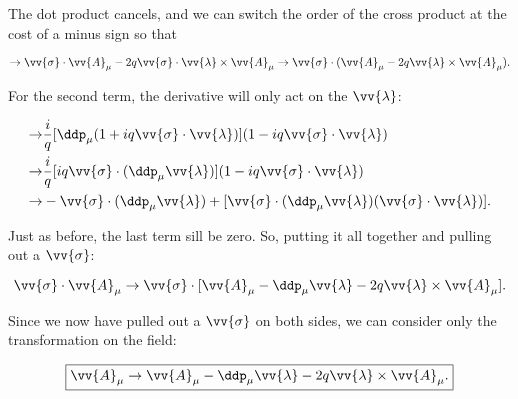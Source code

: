 The dot product cancels, and we can switch the order of the cross product at the cost of a minus sign so that

\begin{equation}
  \rightarrow \vv{\sigma}\cdot\vv{A}_{\mu} - 2q\vv{\sigma} \cdot \vv{\lambda}\times\vv{A}_{\mu} \rightarrow \vv{\sigma} \cdot (\vv{A}_{\mu} - 2q\vv{\lambda}\times\vv{A}_{\mu}).
\end{equation}

For the second term, the derivative will only act on the $\vv{\lambda}$:

\begin{align}
  \rightarrow& \frac{i}{q}[\ddp_{\mu}(1 + iq\vv{\sigma}\cdot\vv{\lambda})](1 - iq\vv{\sigma}\cdot\vv{\lambda}) \\
  \rightarrow& \frac{i}{q}[iq \vv{\sigma}\cdot(\ddp_{\mu}\vv{\lambda})](1 - iq\vv{\sigma}\cdot\vv{\lambda}) \\
  \rightarrow& -\vv{\sigma} \cdot (\ddp_{\mu}\vv{\lambda}) + [\vv{\sigma} \cdot (\ddp_{\mu}\vv{\lambda})(\vv{\sigma}\cdot\vv{\lambda})].
\end{align}

Just as before, the last term sill be zero. So, putting it all together and pulling out a $\vv{\sigma}$:

\begin{equation}
  \vv{\sigma}\cdot\vv{A}_{\mu} \rightarrow \vv{\sigma} \cdot [\vv{A}_{\mu} - \ddp_{\mu}\vv{\lambda} - 2q\vv{\lambda} \times \vv{A}_{\mu}].
\end{equation}

Since we now have pulled out a $\vv{\sigma}$ on both sides, we can consider only the transformation on the field:

\begin{equation}
  \boxed{\vv{A}_{\mu} \rightarrow \vv{A}_{\mu} - \ddp_{\mu}\vv{\lambda} - 2q \vv{\lambda}\times\vv{A}_{\mu}.}
\end{equation}



